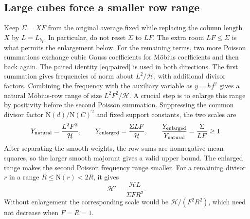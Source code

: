 \documentclass[11pt]{article}
\newcommand{\N}{\mathrm N}
\numberwithin{equation}{section}
\begin{document}
\subsection{Large cubes force a smaller row range}
Keep $\Sigma=XF$ from the original average fixed while replacing the
column length $X$ by $L=L_{b_1}$. In particular, do not reset $\Sigma$
to $LF$. The extra room $LF\le\Sigma$ is what permits the enlargement
below.
For the remaining terms, two more Poisson summations exchange cubic
Gauss coefficients for M\"obius coefficients and then back again.
The paired identity \eqref{eq:paired} is used in both directions.
The first summation gives frequencies of norm about $L^2/\mathcal H$,
with additional divisor factors. Combining the frequency with the
auxiliary variable as $y=hf^2$ gives a natural M\"obius-row range of size
$L^2F^2/\mathcal H$. A crucial step is to enlarge this range by positivity
before the second Poisson summation. Suppressing the common divisor
factor $\N(d)/\N(C)^2$ and fixed support constants, the two scales are
\begin{equation}\label{eq:Yscales}
 Y_{\rm natural}=\frac{L^2F^2}{\mathcal H},\qquad
 Y_{\rm enlarged}=\frac{\Sigma LF}{\mathcal H},\qquad
 \frac{Y_{\rm enlarged}}{Y_{\rm natural}}=\frac{\Sigma}{LF}\ge1.
\end{equation}
After separating the smooth weights, the row sums are nonnegative mean
squares, so the larger smooth majorant gives a valid upper bound.
The enlarged range makes the second Poisson frequency range smaller.
For a remaining divisor $r$ in a range $R\le\N(r)<2R$, it gives
\begin{equation}\label{eq:Hprime}
 \mathcal H'=\frac{\mathcal HL}{\Sigma FR^2}.
\end{equation}
Without enlargement the corresponding scale would be
$\mathcal H/(F^2R^2)$, which need not decrease when $F=R=1$.
\end{document}
